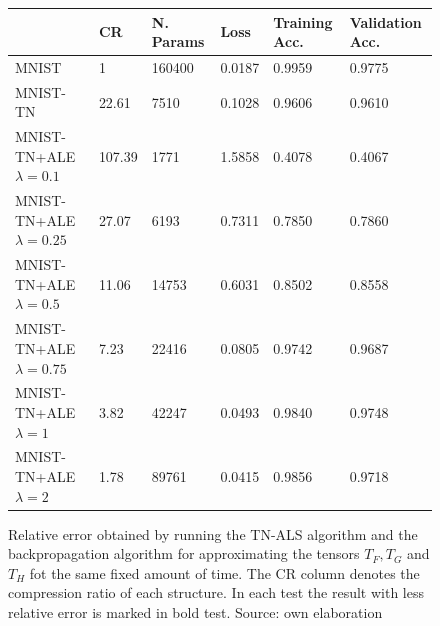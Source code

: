 \documentclass[11pt,a4paper,openright,oneside]{book}
\numberwithin{equation}{section}
\begin{document}
{\begin{figure}[H]
    \centering
\renewcommand{\arraystretch}{1.25}
\begin{tabular}{llllll}
\hline
            & CR & N. Params & Loss & Training Acc. & Validation Acc. \\ \hline
    MNIST     & 1 & 160400 & 0.0187 & 0.9959 & 0.9775  \\
    MNIST-TN     & 22.61 & 7510 & 0.1028 & 0.9606 & 0.9610 \\ \hline
    MNIST-TN+ALE $\lambda = 0.1$ & 107.39 & 1771 & 1.5858 & 0.4078 & 0.4067 \\
    MNIST-TN+ALE $\lambda = 0.25$ & 27.07 & 6193 &  0.7311 & 0.7850 & 0.7860 \\
    MNIST-TN+ALE $\lambda = 0.5$ & 11.06 & 14753 & 0.6031 & 0.8502 & 0.8558 \\
    MNIST-TN+ALE $\lambda = 0.75$ & 7.23 & 22416 & 0.0805 & 0.9742 & 0.9687 \\
    MNIST-TN+ALE $\lambda = 1$ & 3.82 & 42247 & 0.0493 & 0.9840 & 0.9748 \\
    MNIST-TN+ALE $\lambda = 2$ & 1.78 & 89761 & 0.0415 & 0.9856 & 0.9718 \\
\end{tabular}

\caption{Relative error obtained by running the TN-ALS algorithm and the backpropagation algorithm for approximating
    the tensors $T_F, T_G$ and $T_H$ fot the same fixed amount of time. The CR column denotes the compression ratio of each structure.
In each test the result with less relative error is marked in bold test. Source: own elaboration}
\label{fig:ap-table-backprop}
\end{figure}

\begin{figure}[H]
    \centering

\begin{adjustwidth}{-3cm}{-3cm}


\end{adjustwidth}
\end{figure}}
\end{document}
